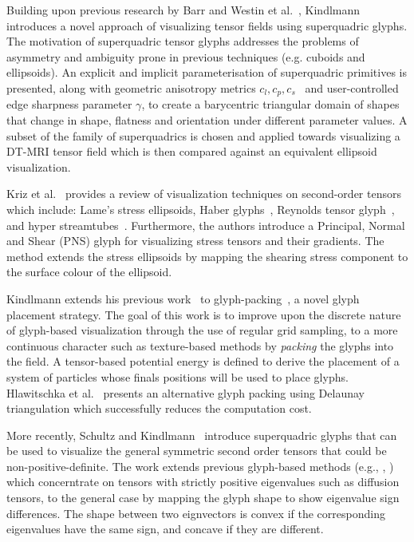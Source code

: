 Building upon previous research by Barr \cite{barr81} and Westin et al.~\cite{westin02processing}, Kindlmann~\cite{kindlmann04superquad} introduces a novel approach of visualizing tensor fields using superquadric glyphs. 
The motivation of superquadric tensor glyphs addresses the problems of asymmetry and ambiguity prone in previous techniques (e.g. cuboids and ellipsoids). 
An explicit and implicit parameterisation of superquadric primitives is presented, along with geometric anisotropy metrics $c_l, c_p, c_s$~\cite{westin02processing} and user-controlled edge sharpness parameter $\gamma$, to create a barycentric triangular domain of shapes that change in shape, flatness and orientation under different parameter values. A subset of the family of superquadrics is chosen and applied towards visualizing a DT-MRI tensor field which is then compared against an equivalent ellipsoid visualization.

Kriz et al.~\cite{kriz05zeroth} provides a review of visualization techniques on second-order tensors which include: Lame's stress ellipsoids, Haber glyphs~\cite{haber90}, Reynolds tensor glyph~\cite{hashash03}, and hyper streamtubes~\cite{delmarcelle93}. Furthermore, the authors introduce a Principal, Normal and Shear (PNS) glyph for visualizing stress tensors and their gradients. The method extends the stress ellipsoids by mapping the shearing stress component to the surface colour of the ellipsoid.  

Kindlmann extends his previous work~\cite{kindlmann04superquad} to glyph-packing~\cite{kindlmannWestin06glyphPacking}, a novel glyph placement strategy. 
The goal of this work is to improve upon the discrete nature of glyph-based visualization through the use of regular grid sampling, to a more continuous character such as texture-based methods by \emph{packing} the glyphs into the field. 
A tensor-based potential energy is defined to derive the placement of a system of particles whose finals positions will be used to place glyphs. 
Hlawitschka et al.~\cite{hlawitschka07interactiveGlyphPlacement} presents an alternative glyph packing using Delaunay triangulation which successfully reduces the computation cost.

More recently, Schultz and Kindlmann~\cite{SchultzKindlmann10symmetricTensors} introduce superquadric glyphs that can be used to visualize the general symmetric second order tensors that could be non-positive-definite.
The work extends previous glyph-based methods (e.g., \cite{kindlmann04superquad}, \cite{westin02processing}) which concerntrate on tensors with strictly positive eigenvalues such as diffusion tensors, to the general case by mapping the glyph shape to show eigenvalue sign differences.
The shape between two eignvectors is convex if the corresponding eigenvalues have the same sign, and concave if they are different. 

